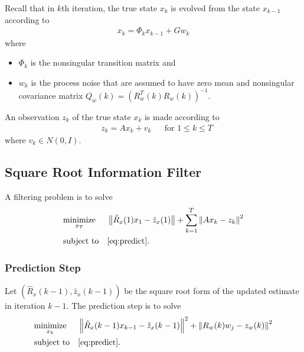 \documentclass[microtype]{gtpart}     %
\theoremstyle{definition}
\newcommand{\norm}[1]{\left\lVert#1\right\rVert}
\begin{document}
Recall that in $k$th iteration, the true state $x_k$ is evolved from the state $x_{k-1}$ according to
\begin{align}
x_k = \Phi_k x_{k-1} + Gw_k \label{eq:predict}
\end{align}
where
\begin{itemize}
	\item $\Phi_k$ is the nonsingular transition matrix and
	\item $w_k$ is the process noise that are assumed to have zero mean and nonsingular covariance matrix 
	$Q_w(k)=(R^T_w(k)R_w(k))^{-1}$.
\end{itemize}
An observation $z_k$ of the true state $x_k$ is made according to
\begin{align*}
	&z_k = A x_k + v_k & &\text{for } 1\leq k \leq T
\end{align*}
where $v_k \in N(0, I)$.

\subsection{Square Root Information Filter}

A filtering problem is to solve
\begin{align*}
& \underset{x_T}{\text{minimize}} & & \norm{\tilde{R}_x(1)x_1 - \tilde{z}_x(1)} + \sum_{k=1}^{T}\norm{Ax_k - z_k}^2 \\
& \text{subject to} & & \cref{eq:predict}.
\end{align*}

\subsubsection{Prediction Step}

Let $(\hat{R}_x(k-1), \hat{z}_x(k-1))$ be the square root form of the updated estimate in iteration $k-1$.
The prediction step is to solve
\begin{align*}
	& \underset{x_k}{\text{minimize}} & &\norm{\hat{R}_x(k-1)x_{k-1} - \hat{z}_x(k-1)}^2 + \norm{R_w(k)w_j - z_w(k)}^2 \\
	& \text{subject to} & & \cref{eq:predict}.
\end{align*}
\end{document}
